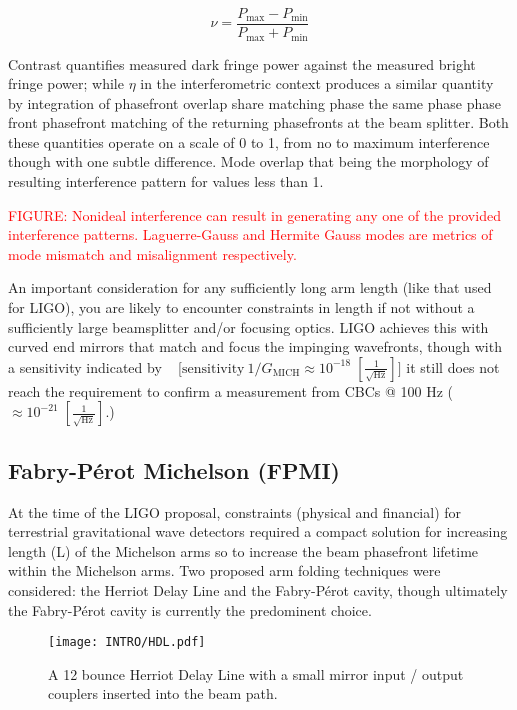 \begin{equation}\label{eq:contrast}
	\nu = \frac{P_\mathrm{max} - P_\mathrm{min}}{P_\mathrm{max} + P_\mathrm{min}}
\end{equation}

Contrast quantifies measured dark fringe power against the measured bright fringe power; while $\eta$ in the interferometric context produces a similar quantity by integration of phasefront overlap share matching phase the same phase phase front phasefront matching of the returning phasefronts at the beam splitter. Both these quantities operate on a scale of 0 to 1, from no to maximum interference though with one subtle difference. Mode overlap that being the morphology of resulting interference pattern for values less than 1. 

\textcolor{red}{FIGURE: Nonideal interference can result in generating any one of the provided interference patterns. Laguerre-Gauss and Hermite Gauss modes are metrics of mode mismatch and misalignment respectively.}

An important consideration for any sufficiently long arm length (like that used for LIGO), you are likely to encounter constraints in length if not without a sufficiently large beamsplitter and/or focusing optics. LIGO achieves this with curved end mirrors that match and focus the impinging wavefronts, though with a sensitivity indicated by ~\cite{} [$\mathrm{sensitivity} ~ 1/G_\mathrm{MICH} \approx 10^{-18} \; [\frac{1}{\sqrt{\mathrm{Hz}}}]]$ it still does not reach the requirement to confirm a measurement from CBCs @ 100 Hz ($\approx 10^{-21} \; [\frac{1}{\sqrt{\mathrm{Hz}}}]$.)

\subsection{Fabry-P\'{e}rot Michelson (FPMI)}
At the time of the LIGO proposal, constraints (physical and financial) for terrestrial gravitational wave detectors required a compact solution for increasing length (L) of the Michelson arms so to increase the beam phasefront lifetime within the Michelson arms. Two proposed arm folding techniques were considered: the Herriot Delay Line and the Fabry-P\'{e}rot cavity, though ultimately the Fabry-P\'{e}rot cavity is currently the predominent choice.

\begin{figure}[ht!]
	\centering
	\texttt{[image: INTRO/HDL.pdf]}
	\caption{A 12 bounce Herriot Delay Line with a small mirror input / output couplers inserted into the beam path.}
	\label{fig:hdl_cav}
\end{figure}


